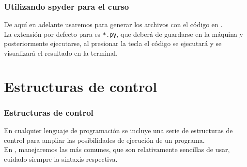 \begin{frame}[fragile]
\frametitle{Utilizando spyder para el curso}
De aquí en adelante usaremos  para generar los archivos con el código en \python.
\\
\bigskip
La extensión por defecto para \python es \texttt{*.py}, que deberá de guardarse en la máquina y posteriormente ejecutarse, al presionar la tecla  el código se ejecutará y se visualizará el resultado en la terminal.
\end{frame}
\section{Estructuras de control}
\begin{frame}
\frametitle{Estructuras de control}
En cualquier lenguaje de programación se incluye una serie de estructuras de control para ampliar las posibilidades de ejecución de un programa.
\\
\bigskip
En \python, manejaremos las más comunes, que son relativamente sencillas de usar, cuidado siempre la sintaxis respectiva.
\end{frame}
